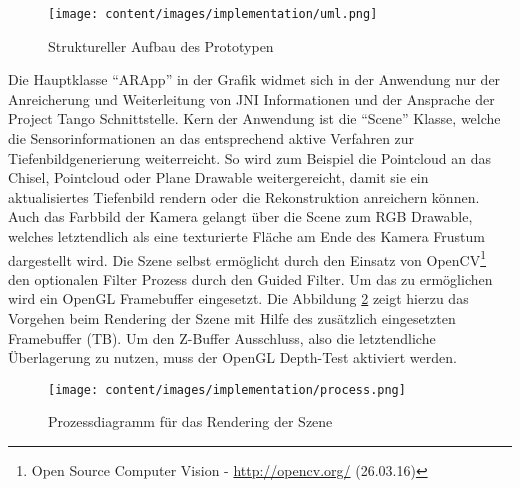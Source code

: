 \begin{figure}[h]
  \centering
	\texttt{[image: content/images/implementation/uml.png]} 
  \caption{Struktureller Aufbau des Prototypen}
  \label{fig:structure}
\end{figure}

Die Hauptklasse \enquote{ARApp} in der Grafik widmet sich in der Anwendung nur der Anreicherung und Weiterleitung von JNI Informationen und der Ansprache der Project Tango Schnittstelle. Kern der Anwendung ist die \enquote{Scene} Klasse, welche die Sensorinformationen an das entsprechend aktive Verfahren zur Tiefenbild\-generierung weiterreicht. So wird zum Beispiel die Pointcloud an das Chisel, Pointcloud oder Plane Drawable weitergereicht, damit sie ein aktualisiertes Tiefenbild rendern oder die Rekonstruktion anreichern können. Auch das Farbbild der Kamera gelangt über die Scene zum RGB Drawable, welches letztendlich als eine texturierte Fläche am Ende des Kamera Frustum dargestellt wird. Die Szene selbst ermöglicht durch den Einsatz von OpenCV\footnote{Open Source Computer Vision - \url{http://opencv.org/} (26.03.16)} den optionalen Filter Prozess durch den Guided Filter. Um das zu ermöglichen wird ein OpenGL Framebuffer eingesetzt. Die Abbildung \ref{fig:rendering-process} zeigt hierzu das Vorgehen beim Rendering der Szene mit Hilfe des zusätzlich eingesetzten Framebuffer (TB). Um den Z-Buffer Ausschluss, also die letztendliche Überlagerung zu nutzen, muss der OpenGL Depth-Test aktiviert werden.


\begin{figure}[h]
  \centering
	\texttt{[image: content/images/implementation/process.png]} 
  \caption{Prozessdiagramm für das Rendering der Szene}
  \label{fig:rendering-process}
\end{figure}